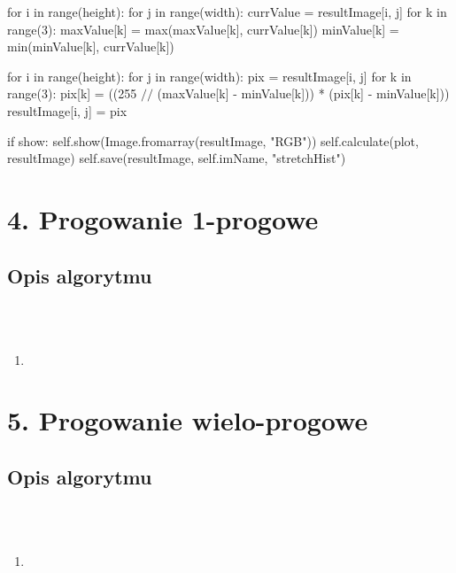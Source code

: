 \documentclass[final,a4paper,openany,12pt]{mwbk}
\begin{document}
\noindent for i in range(height): \newline
for j in range(width): \newline
currValue = resultImage[i, j] \newline
for k in range(3): \newline
maxValue[k] = max(maxValue[k], currValue[k]) \newline
minValue[k] = min(minValue[k], currValue[k]) \newline

\noindent for i in range(height): \newline
for j in range(width): \newline
pix = resultImage[i, j] \newline
for k in range(3): \newline
pix[k] = ((255 $//$ (maxValue[k] - minValue[k])) * (pix[k] - minValue[k])) \newline
resultImage[i, j] = pix \newline

\noindent if show: \newline
self.show(Image.fromarray(resultImage, "RGB")) \newline
self.calculate(plot, resultImage) \newline
self.save(resultImage, self.imName, "stretchHist") \newline
\newpage

\section*{4. Progowanie 1-progowe}
\subsection*{Opis algorytmu}
\hfill
\\\\
\indent 
\begin{enumerate}
	\item 
\end{enumerate}

\newpage

\section*{5. Progowanie wielo-progowe}
\subsection*{Opis algorytmu}
\hfill
\\\\
\indent 
\begin{enumerate}
	\item 
\end{enumerate}
\newpage
\end{document}
